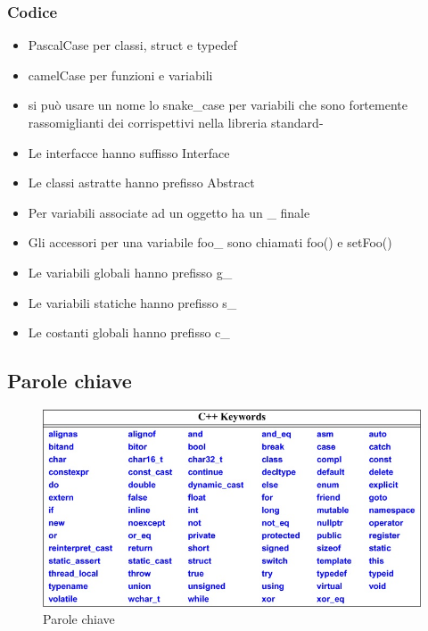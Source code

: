 \documentclass[11pt,a4paper]{book}
\begin{document}
\subsubsection{Codice}
\begin{itemize}
	\item PascalCase per classi, struct e typedef
	\item camelCase per funzioni e variabili
	\item si può usare un nome lo snake\_case per variabili che sono fortemente rassomiglianti dei corrispettivi nella libreria standard-
	\item Le interfacce hanno suffisso Interface
	\item Le classi astratte hanno prefisso Abstract
	\item Per variabili associate ad un oggetto ha un \_ finale
	\item Gli accessori per una variabile foo\_ sono chiamati foo() e setFoo()
	\item Le variabili globali hanno prefisso g\_
	\item Le variabili statiche hanno prefisso s\_
	\item Le costanti globali hanno prefisso c\_
\end{itemize}

\subsection{Parole chiave}
\begin{figure}[h!]
	\begin{center}
		\includegraphics[scale=0.6]{img/014.jpg}
		\caption{Parole chiave}
		\label{fig: 014}
	\end{center}
\end{figure}
\end{document}
